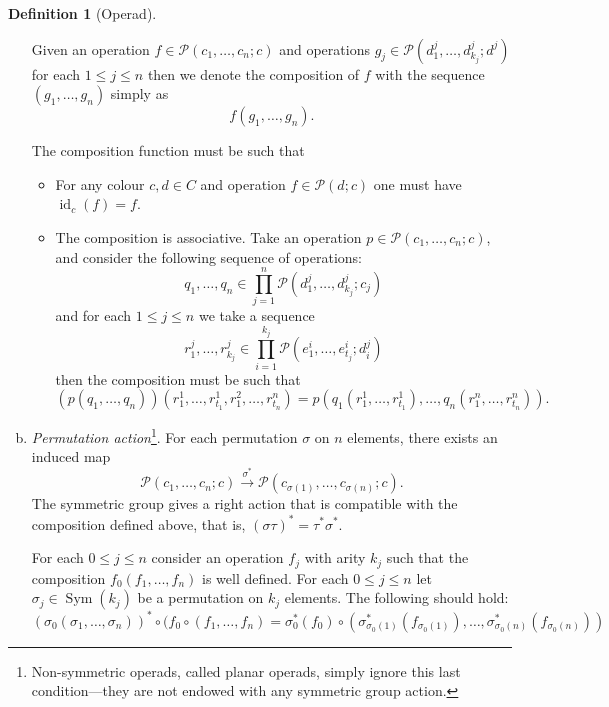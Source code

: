 \documentclass[11pt, reqno]{amsart}
\theoremstyle{definition}
\newtheorem{definition}[theorem]{Definition}
\renewcommand{\leq}{\leqslant}
\DeclareMathOperator{\Id}{id}     %
\DeclareMathOperator{\Sym}{Sym} %
\newcommand{\operad}{\mathcal}
\begin{document}
\begin{definition}[Operad]
\begin{enumerate}[(a)]
    Given an operation \(f \in \operad P(c_1, \dots, c_n; c)\) and operations
    \(g_j \in \operad P(d_{1}^j, \dots, d_{k_j}^j; d^j)\) for each \(1 \leq j
    \leq n\) then we denote the composition of \(f\) with the sequence \((g_1,
    \dots, g_n)\) simply as
    \[
    f (g_1, \dots, g_n).
    \]

    The composition function must be such that
    \begin{itemize}
        \item For any colour \(c, d \in C\) and operation \(f \in \operad P(d; c)\)
            one must have \(\Id_c(f) = f\).

        \item The composition is associative. Take an operation \(p \in \operad P(c_1,
            \dots, c_n; c)\), and consider the following sequence of operations:
            \[
                q_1, \dots, q_n \in \prod_{j=1}^n \operad P(d_1^j, \dots, d_{k_j}^j; c_j)
            \]
            and for each \(1 \leq j \leq n\) we take a sequence
            \[
                r_1^j, \dots, r_{k_j}^j \in 
                \prod_{i=1}^{k_j} \operad P(e_1^i, \dots, e_{t_j}^i; d_i^j)
            \]
            then the composition must be such that
            \[
                (p(q_1, \dots, q_n))(r_1^1, \dots, r_{t_1}^1, r_1^2, \dots, r_{t_n}^n)
                = p(q_1(r_1^1, \dots, r_{t_1}^1), \dots, q_n(r_1^n, \dots, r_{t_n}^n)).
            \]
    \end{itemize}


    \item \emph{Permutation action}\footnote{Non-symmetric operads, called planar
        operads, simply ignore this last condition---they are not endowed with any
    symmetric group action.}. For each permutation \(\sigma\) on \(n\) elements,
    there exists an induced map
    \[
        \operad P(c_1, \dots, c_n; c)
        \overset{\sigma^{*}}\longrightarrow
        \operad P(c_{\sigma(1)}, \dots, c_{\sigma(n)}; c).
    \]
    The symmetric group gives a right action that is compatible with the
    composition defined above, that is, \((\sigma \tau)^* = \tau^* \sigma^*\).

    For each \(0 \leq j \leq n\) consider an operation \(f_j\) with arity \(k_j\)
    such that the composition \(f_0 (f_1, \dots, f_n)\) is well defined. For each
    \(0 \leq j \leq n\) let \(\sigma_j \in \Sym(k_j)\) be a permutation on \(k_j\)
    elements. The following should hold:
    \[
        (\sigma_0 (\sigma_1, \dots, \sigma_n))^*
        \circ (f_0 \circ (f_1, \dots, f_n)
        =
        \sigma_0^*(f_0) \circ 
        (\sigma_{\sigma_0(1)}^*(f_{\sigma_0(1)}),
        \dots,
        \sigma_{\sigma_0(n)}^*(f_{\sigma_0(n)}))
    \]
\end{enumerate}
\end{definition}
\end{document}
